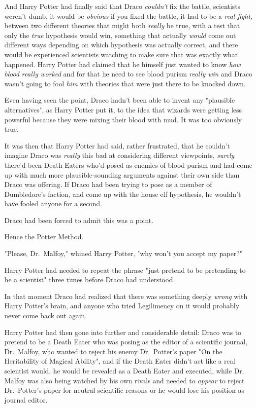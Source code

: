 And Harry Potter had finally said that Draco \emph{couldn't} fix the battle,
scientists weren't dumb, it would be \emph{obvious} if you fixed the battle, it
had to be a \emph{real fight,} between two different theories that might both
\emph{really} be true, with a test that only the \emph{true} hypothesis would
win, something that actually \emph{would} come out different ways depending on
which hypothesis was actually correct, and there would be experienced
scientists watching to make sure that was exactly what happened. Harry Potter
had claimed that he himself just wanted to know \emph{how blood really worked}
and for that he need to see blood purism \emph{really win} and Draco wasn't
going to fool \emph{him} with theories that were just there to be knocked down.

Even having seen the point, Draco hadn't been able to invent any "plausible
alternatives", as Harry Potter put it, to the idea that wizards were getting
less powerful because they were mixing their blood with mud. It was too
obviously true.

It was then that Harry Potter had said, rather frustrated, that he couldn't
imagine Draco was \emph{really} this bad at considering different viewpoints,
\emph{surely} there'd been Death Eaters who'd posed as enemies of blood purism
and had come up with much more plausible-sounding arguments against their own
side than Draco was offering. If Draco had been trying to pose as a member of
Dumbledore's faction, and come up with the house elf hypothesis, he wouldn't
have fooled anyone for a second.

Draco had been forced to admit this was a point.

Hence the Potter Method.

"Please, Dr.~Malfoy," whined Harry Potter, "why won't you accept my paper?"

Harry Potter had needed to repeat the phrase "just pretend to be pretending to
be a scientist" three times before Draco had understood.

In that moment Draco had realized that there was something deeply \emph{wrong}
with Harry Potter's brain, and anyone who tried Legilimency on it would
probably never come back out again.

Harry Potter had then gone into further and considerable detail: Draco was to
pretend to be a Death Eater who was posing as the editor of a scientific
journal, Dr.~Malfoy, who wanted to reject his enemy Dr.~Potter's paper "On the
Heritability of Magical Ability", and if the Death Eater didn't act like a real
scientist would, he would be revealed as a Death Eater and executed, while Dr.
Malfoy was also being watched by his own rivals and needed to \emph{appear} to
reject Dr.~Potter's paper for neutral scientific reasons or he would lose his
position as journal editor.

